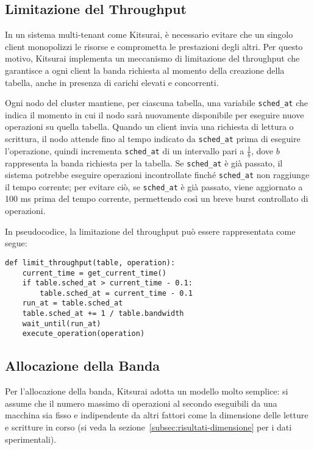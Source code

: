 \subsection{Limitazione del Throughput}
\label{subsec:limitazione-throughput}

In un sistema multi-tenant come Kitsurai, è necessario evitare che un singolo client monopolizzi le risorse e comprometta le prestazioni degli altri.
Per questo motivo, Kitsurai implementa un meccanismo di limitazione del throughput che garantisce a ogni client la banda richiesta al momento della creazione della tabella, anche in presenza di carichi elevati e concorrenti.

Ogni nodo del cluster mantiene, per ciascuna tabella, una variabile \texttt{sched\_at} che indica il momento in cui il nodo sarà nuovamente disponibile per eseguire nuove operazioni su quella tabella.
Quando un client invia una richiesta di lettura o scrittura, il nodo attende fino al tempo indicato da \texttt{sched\_at} prima di eseguire l'operazione, quindi incrementa \texttt{sched\_at} di un intervallo pari a $\displaystyle \frac{1}{b}$, dove $b$ rappresenta la banda richiesta per la tabella.
Se \texttt{sched\_at} è già passato, il sistema potrebbe eseguire operazioni incontrollate finché \texttt{sched\_at} non raggiunge il tempo corrente; per evitare ciò, se \texttt{sched\_at} è già passato, viene aggiornato a 100 ms prima del tempo corrente, permettendo così un breve burst controllato di operazioni.

\begin{samepage}
\noindent In pseudocodice, la limitazione del throughput può essere rappresentata come segue:
\begin{verbatim}
def limit_throughput(table, operation):
    current_time = get_current_time()
    if table.sched_at > current_time - 0.1:
        table.sched_at = current_time - 0.1
    run_at = table.sched_at
    table.sched_at += 1 / table.bandwidth
    wait_until(run_at)
    execute_operation(operation)
\end{verbatim}
\end{samepage}

\subsection{Allocazione della Banda}
\label{subsec:allocazione-banda}

Per l'allocazione della banda, Kitsurai adotta un modello molto semplice: si assume che il numero massimo di operazioni al secondo eseguibili da una macchina sia fisso e indipendente da altri fattori come la dimensione delle letture e scritture in corso (si veda la sezione~\ref{subsec:risultati-dimensione} per i dati sperimentali).

